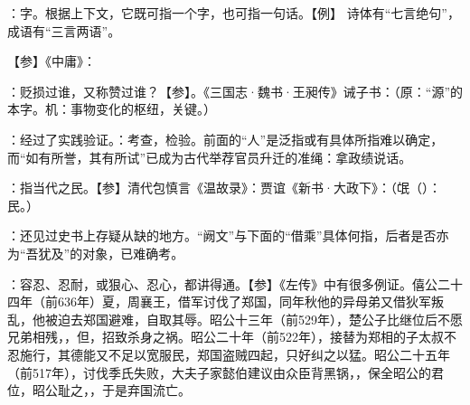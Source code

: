 {
\begin{lyitemize}
\item {}：字。根据上下文，它既可指一个字，也可指一句话。【例】  诗体有“七言绝句”，成语有“三言两语”。 %
\end{lyitemize}
【参】《中庸》：
}
{}


{
\item {}：贬损过谁，又称赞过谁？【参】。《三国志·魏书·王昶传》诫子书：（原：“源”的本字。机：事物变化的枢纽，关键。）
\item {}：经过了实践验证。：考查，检验。前面的“人”是泛指或有具体所指难以确定，而“如有所誉，其有所试”已成为古代举荐官员升迁的准绳：拿政绩说话。
\item {}：指当代之民。【参】清代包慎言《温故录》：贾谊《新书·大政下》：（氓（）：民。）
}
{}


{
\item {}：还见过史书上存疑从缺的地方。“阙文”与下面的“借乘”具体何指，后者是否亦为“吾犹及”的对象，已难确考。
}
{}


{
\item {}：容忍、忍耐，或狠心、忍心，都讲得通。【参】《左传》中有很多例证。僖公二十四年（前636年）夏，周襄王，借军讨伐了郑国，同年秋他的异母弟又借狄军叛乱，他被迫去郑国避难，自取其辱。昭公十三年（前529年），楚公子比继位后不愿兄弟相残，，但，招致杀身之祸。昭公二十年（前522年），接替为郑相的子太叔不忍施行，其德能又不足以宽服民，郑国盗贼四起，只好纠之以猛。昭公二十五年（前517年），讨伐季氏失败，大夫子家懿伯建议由众臣背黑锅，，保全昭公的君位，昭公耻之，，于是弃国流亡。
}
{}


